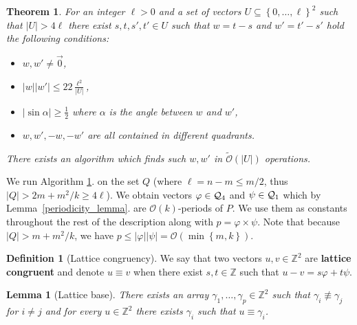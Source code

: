 \documentclass[11pt]{article}
\newcommand{\Z}{\mathbb{Z}}
\renewcommand{\O}{\mathcal{O}}
\newcommand{\tO}{\tilde{\mathcal{O}}}
\renewcommand{\phi}{\varphi}
\newcommand{\set}[1]{\left\lbrace #1 \right\rbrace}
\theoremstyle{plain}
\newtheorem{theorem}{Theorem}
\newtheorem{lemma}{Lemma}
\theoremstyle{definition}
\newtheorem{definition}{Definition}
\theoremstyle{remark}
\begin{document}
\begin{theorem}
	\label{get_periods}
	For an integer $\ell > 0$ and a set of vectors $U \subseteq \set{0, \dots, \ell}^2 $ such that $|U| > 4\ell$ there exist $s, t, s', t' \in U$ such that $w = t - s$ and $w' = t' - s'$ hold the following conditions:
	\begin{itemize}
		\item $w, w' \neq \vec{0}$,
		\item $|w||w'| \le 22\frac{\ell^2}{|U|}$,
		\item $|\sin \alpha| \ge \frac{1}{2}$ where $\alpha$ is the angle between $w$ and $w'$,
		\item $w, w', -w, -w'$ are all contained in different quadrants.
	\end{itemize}
	There exists an algorithm which finds such $w, w'$ in $\tO(|U|)$ operations.
\end{theorem}


We run Algorithm \ref{get_periods}. on the set $Q$ (where $\ell = n - m \le m / 2$, thus $|Q| > 2m + m^2/k \ge 4\ell$).
We obtain vectors $\phi \in \Q_4$ and $\psi \in \mathcal{Q}_1$ which by Lemma~\ref{periodicity_lemma}. are $\O(k)$-periods of $P$.
We use them as constants throughout the rest of the description along with $p = \phi \times \psi$.
Note that because $|Q| > m + m^2 / k$, we have $p \le |\phi||\psi| = \O(\min\set{m, k})$.


\begin{definition}[Lattice congruency]
	We say that two vectors $u, v \in \Z^2$ are \textbf{lattice congruent} and denote $u \equiv v$ when there exist $s, t \in \Z$ such that $u - v = s\phi + t\psi$.
\end{definition}


\begin{lemma}[Lattice base]\label{lattice_base}
	There exists an array $\gamma_1, \dots, \gamma_p \in \Z^2$ such that $\gamma_i \not \equiv \gamma_j$ for $i \neq j$ and for every $u \in \Z^2$ there exists $\gamma_i$ such that $u \equiv \gamma_i$.
\end{lemma}
\end{document}
